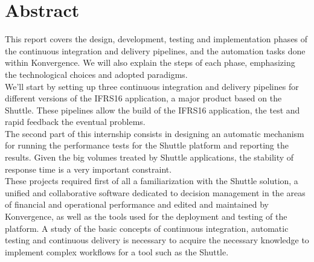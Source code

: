 \chapter*{Abstract}

This report covers the design, development, testing and implementation phases of the continuous integration and delivery pipelines, and the automation tasks done within Konvergence. We will also explain the steps of each phase, emphasizing the technological choices and adopted paradigms.\\

We'll start by setting up three continuous integration and delivery pipelines for different versions of the IFRS16 application, a major product based on the Shuttle. These pipelines allow the build of the IFRS16 application, the test and rapid feedback the eventual problems.\\

The second part of this internship consists in designing an automatic mechanism for running the performance tests for the Shuttle platform and reporting the results. Given the big volumes treated by Shuttle applications, the stability of response time is a very important constraint.\\

These projects required first of all a familiarization with the Shuttle solution, a unified and collaborative software dedicated to decision management in the areas of financial and operational performance and edited and maintained by Konvergence, as well as the tools used for the deployment and testing of the platform. A study of the basic concepts of continuous integration, automatic testing and continuous delivery is necessary to acquire the necessary knowledge to implement complex workflows for a tool such as the Shuttle.\\
